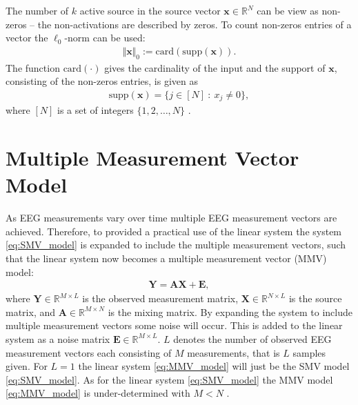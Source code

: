 The number of $k$ active source in the source vector $\mathbf{x} \in \mathbb{R}^N$ can be view as non-zeros -- the non-activations are described by zeros. To count non-zeros entries of a vector the $\ell_0$-norm can be used:
\begin{align*}
\Vert \mathbf{x} \Vert_0 := \text{card}(\text{supp}(\mathbf{x})).
\end{align*}
The function $\text{card}(\cdot)$ gives the cardinality of the input and the support of $\mathbf{x}$, consisting of the non-zeros entries, is given as
\begin{align*}
\text{supp}(\mathbf{x}) = \{ j \in [N] \ : \ x_j \neq 0 \},
\end{align*} 
where $[N]$ is a set of integers $\lbrace 1, 2, \hdots, N \rbrace$ \cite[p. 41]{FR}. 


\section{Multiple Measurement Vector Model}\label{sec:MMV}
As EEG measurements vary over time multiple EEG measurement vectors are achieved. 
Therefore, to provided a practical use of the linear system the system \eqref{eq:SMV_model} is expanded to include the multiple measurement vectors, such that the linear system now becomes a multiple measurement vector (MMV) model:
\begin{align}\label{eq:MMV_model}
\mathbf{Y} = \mathbf{AX}+\textbf{E},
\end{align}
where $\mathbf{Y} \in \mathbb{R}^{M \times L}$ is the observed measurement matrix, $\mathbf{X} \in \mathbb{R}^{N \times L}$ is the source matrix, and $\mathbf{A} \in \mathbb{R}^{M \times N}$ is the mixing matrix. 
By expanding the system to include multiple measurement vectors some noise will occur. 
This is added to the linear system as a noise matrix $\textbf{E} \in \mathbb{R}^{M \times L}$. 
$L$ denotes the number of observed EEG measurement vectors each consisting of $M$ measurements, that is $L$ samples given. 
For $L = 1$ the linear system \eqref{eq:MMV_model} will just be the SMV model \eqref{eq:SMV_model}.
As for the linear system \eqref{eq:SMV_model} the MMV model \eqref{eq:MMV_model} is under-determined with $M < N$ \cite[p. 42]{CS}.

